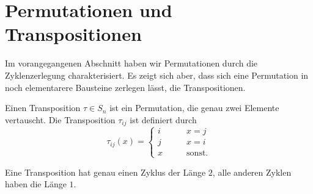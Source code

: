 %
%
%
\section{Permutationen und Transpositionen
\label{buch:section:permutationen-und-transpositionen}}
Im vorangegangenen Abschnitt haben wir Permutationen durch die
Zyklenzerlegung charakterisiert.
Es zeigt sich aber, dass sich eine Permutation in noch elementarere
Bausteine zerlegen lässt, die Transpositionen.

\begin{definition}
Einen Transposition $\tau\in S_n$ ist ein Permutation, die genau
zwei Elemente vertauscht.
Die Transposition $\tau_{ij}$ ist definiert durch
\[
\tau_{ij}(x)
=
\begin{cases}
i&\qquad x=j\\
j&\qquad x=i\\
x&\qquad\text{sonst.}
\end{cases}
\]
\end{definition}

Eine Transposition hat genau einen Zyklus der Länge $2$, alle anderen
Zyklen haben die Länge $1$.

